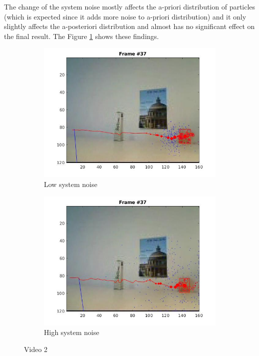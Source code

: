 \documentclass[paper=a4, fontsize=11pt]{scrartcl} %
\numberwithin{equation}{section} %
\numberwithin{figure}{section} %
\numberwithin{table}{section} %
\begin{document}
The change of the system noise mostly affects the a-priori distribution of particles (which is expected since it adds more noise to a-priori distribution) and it only slightly affects the a-posteriori distribution and almost has no significant effect on the final result. The Figure \ref{fig:v2_sys_noise} shows these findings.

\begin{figure}
\centering
\begin{subfigure}{.5\textwidth}
  \centering
  \includegraphics[width=.9\linewidth]{video21_l_sys_sigma.jpg}
  \caption{Low system noise}
\end{subfigure}%
\begin{subfigure}{.5\textwidth}
  \centering
  \includegraphics[width=.9\linewidth]{video21_h_sys_sigma.jpg}
  \caption{High system noise}
\end{subfigure}
\caption{Video 2}
\label{fig:v2_sys_noise}
\end{figure}
\end{document}
